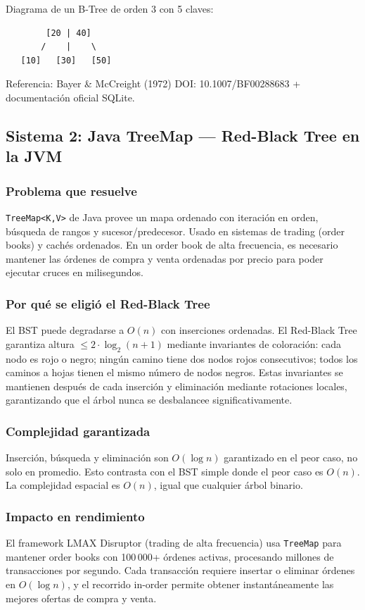 \documentclass{article}
\begin{document}
Diagrama de un B-Tree de orden 3 con 5 claves:

\begin{verbatim}
        [20 | 40]
       /    |    \
   [10]   [30]   [50]
\end{verbatim}

Referencia: Bayer \& McCreight (1972) DOI: 10.1007/BF00288683 + documentación oficial SQLite.

\subsection{Sistema 2: Java TreeMap — Red-Black Tree en la JVM}

\subsubsection{Problema que resuelve}
\texttt{TreeMap<K,V>} de Java provee un mapa ordenado con iteración en orden, búsqueda de rangos y sucesor/predecesor. Usado en sistemas de trading (order books) y cachés ordenados. En un order book de alta frecuencia, es necesario mantener las órdenes de compra y venta ordenadas por precio para poder ejecutar cruces en milisegundos.

\subsubsection{Por qué se eligió el Red-Black Tree}
El BST puede degradarse a $O(n)$ con inserciones ordenadas. El Red-Black Tree garantiza altura $\leq 2 \cdot \log_2(n+1)$ mediante invariantes de coloración: cada nodo es rojo o negro; ningún camino tiene dos nodos rojos consecutivos; todos los caminos a hojas tienen el mismo número de nodos negros. Estas invariantes se mantienen después de cada inserción y eliminación mediante rotaciones locales, garantizando que el árbol nunca se desbalancee significativamente.

\subsubsection{Complejidad garantizada}
Inserción, búsqueda y eliminación son $O(\log n)$ garantizado en el peor caso, no solo en promedio. Esto contrasta con el BST simple donde el peor caso es $O(n)$. La complejidad espacial es $O(n)$, igual que cualquier árbol binario.

\subsubsection{Impacto en rendimiento}
El framework LMAX Disruptor (trading de alta frecuencia) usa \texttt{TreeMap} para mantener order books con 100\,000+ órdenes activas, procesando millones de transacciones por segundo. Cada transacción requiere insertar o eliminar órdenes en $O(\log n)$, y el recorrido in-order permite obtener instantáneamente las mejores ofertas de compra y venta.
\end{document}
